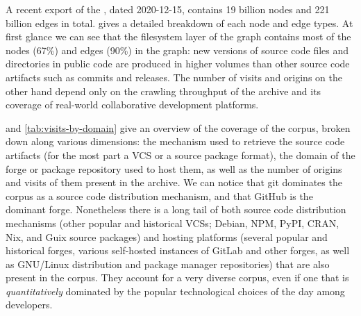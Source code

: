 A recent export of the \SWHGD{}, dated 2020-12-15, contains 19 billion nodes
and 221 billion edges in total.
 gives a detailed breakdown of each node and edge
types. At first glance we can see that the filesystem layer of the graph
contains most of the nodes (67\%) and edges (90\%) in the graph: new versions
of source code files and directories in public code are produced in higher
volumes than other source code artifacts such as commits and releases. The
number of visits and origins on the other hand depend only on the crawling
throughput of the \SWH{} archive and its coverage of real-world collaborative
development platforms.

 and \cref{tab:visits-by-domain} give an overview
of the coverage of the corpus, broken down along various dimensions:
the mechanism used to retrieve the source code artifacts (for the most part a
VCS or a source package format), the domain of the forge or package repository
used to host them, as well as the number of origins and visits of them present
in the archive.  We can notice that git dominates the corpus as a source code
distribution mechanism, and that GitHub is the dominant forge.  Nonetheless
there is a long tail of both source code distribution mechanisms (other popular
and historical VCSs; Debian, NPM, PyPI, CRAN, Nix, and Guix source packages)
and hosting platforms (several popular and historical forges, various
self-hosted instances of GitLab and other forges, as well as GNU/Linux
distribution and package manager repositories) that are also present in the
corpus. They account for a very diverse corpus, even if one that is
\emph{quantitatively} dominated by the popular technological choices of the day
among developers.

